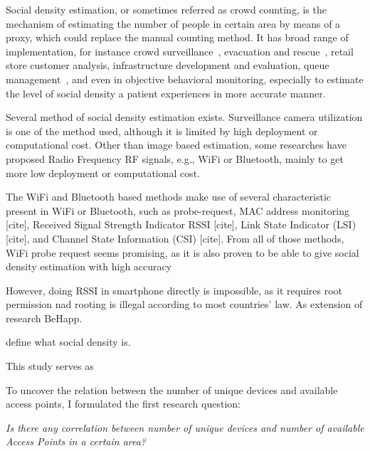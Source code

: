 
Social density estimation, or sometimes referred as crowd counting, is the mechanism of estimating the number of people in certain area by means of a proxy, which could replace the manual counting method. It has broad range of implementation, for instance crowd surveillance~\cite{thesis050}, evacuation and rescue~\cite{thesis045}, retail store customer analysis, infrastructure development and evaluation, queue management~\cite{thesis012}, and even in objective behavioral monitoring, especially to estimate the level of social density a patient experiences in more accurate manner.

Several method of social density estimation exists. Surveillance camera utilization is one of the method used, although it is limited by high deployment or computational cost. Other than image based estimation, some researches have proposed Radio Frequency RF signals, e.g., WiFi or Bluetooth, mainly to get more low deployment or computational cost.

The WiFi and Bluetooth based methods make use of several characteristic present in WiFi or Bluetooth, such as probe-request, MAC address monitoring [cite], Received Signal Strength Indicator \ac{RSSI} [cite], Link State Indicator (LSI) [cite], and Channel State Information (CSI) [cite]. From all of those methods, WiFi probe request seems promising, as it is also proven to be able to give social density estimation with high accuracy~\cite{}

However, doing \ac{RSSI} in smartphone directly is impossible, as it requires root permission nad rooting is illegal according to most countries' law. As extension of research BeHapp.


define what social density is.

This study serves as 

To uncover the relation between the number of unique devices and available access points, I formulated the first research question:
\begin{displayquote}\textit{
Is there any correlation between number of unique devices and number of available Access Points in a certain area?}
\end{displayquote}

